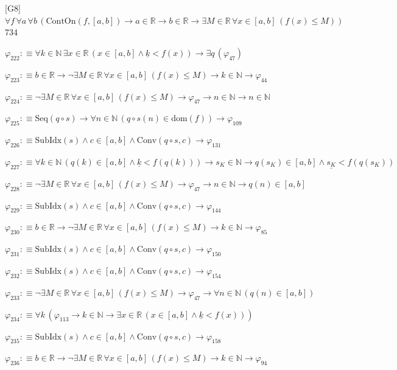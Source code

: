 \begin{fullproof}{[G8]}{$\forall f\,\forall a\,\forall b\,(\mathrm{ContOn}(f,[a,b]) \to a \in \mathbb{R} \to b \in \mathbb{R} \to \exists M \in \mathbb{R}\,\forall x \in [a,b]\,(f(x) \leq M))$}{734}
\begin{abbrevlist}
\item $\varphi_{222} :\equiv \forall k \in \mathbb{N}\,\exists x \in \mathbb{R}\,(x \in [a,b] \land \underline{k} < f(x)) \to \exists q\,(\varphi_{47})$
\item $\varphi_{223} :\equiv b \in \mathbb{R} \to \neg \exists M \in \mathbb{R}\,\forall x \in [a,b]\,(f(x) \leq M) \to k \in \mathbb{N} \to \varphi_{44}$
\item $\varphi_{224} :\equiv \neg \exists M \in \mathbb{R}\,\forall x \in [a,b]\,(f(x) \leq M) \to \varphi_{47} \to n \in \mathbb{N} \to n \in \mathbb{N}$
\item $\varphi_{225} :\equiv \mathrm{Seq}(q \circ s) \to \forall n \in \mathbb{N}\,(q \circ s(n) \in \mathrm{dom}(f)) \to \varphi_{109}$
\item $\varphi_{226} :\equiv \mathrm{SubIdx}(s) \land c \in [a,b] \land \mathrm{Conv}(q \circ s,c) \to \varphi_{131}$
\item $\varphi_{227} :\equiv \forall k \in \mathbb{N}\,(q(k) \in [a,b] \land \underline{k} < f(q(k))) \to s_{K} \in \mathbb{N} \to q(s_{K}) \in [a,b] \land \underline{s_{K}} < f(q(s_{K}))$
\item $\varphi_{228} :\equiv \neg \exists M \in \mathbb{R}\,\forall x \in [a,b]\,(f(x) \leq M) \to \varphi_{47} \to n \in \mathbb{N} \to q(n) \in [a,b]$
\item $\varphi_{229} :\equiv \mathrm{SubIdx}(s) \land c \in [a,b] \land \mathrm{Conv}(q \circ s,c) \to \varphi_{144}$
\item $\varphi_{230} :\equiv b \in \mathbb{R} \to \neg \exists M \in \mathbb{R}\,\forall x \in [a,b]\,(f(x) \leq M) \to k \in \mathbb{N} \to \varphi_{85}$
\item $\varphi_{231} :\equiv \mathrm{SubIdx}(s) \land c \in [a,b] \land \mathrm{Conv}(q \circ s,c) \to \varphi_{150}$
\item $\varphi_{232} :\equiv \mathrm{SubIdx}(s) \land c \in [a,b] \land \mathrm{Conv}(q \circ s,c) \to \varphi_{154}$
\item $\varphi_{233} :\equiv \neg \exists M \in \mathbb{R}\,\forall x \in [a,b]\,(f(x) \leq M) \to \varphi_{47} \to \forall n \in \mathbb{N}\,(q(n) \in [a,b])$
\item $\varphi_{234} :\equiv \forall k\,(\varphi_{113} \to k \in \mathbb{N} \to \exists x \in \mathbb{R}\,(x \in [a,b] \land \underline{k} < f(x)))$
\item $\varphi_{235} :\equiv \mathrm{SubIdx}(s) \land c \in [a,b] \land \mathrm{Conv}(q \circ s,c) \to \varphi_{158}$
\item $\varphi_{236} :\equiv b \in \mathbb{R} \to \neg \exists M \in \mathbb{R}\,\forall x \in [a,b]\,(f(x) \leq M) \to k \in \mathbb{N} \to \varphi_{94}$

\end{abbrevlist}
\end{fullproof}
